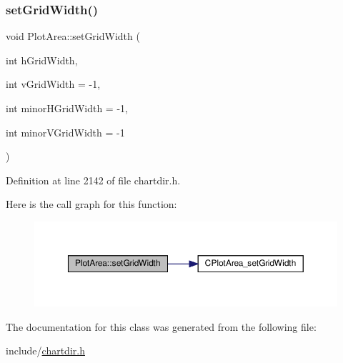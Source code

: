 \subsubsection{\texorpdfstring{set\+Grid\+Width()}{setGridWidth()}}
{\footnotesize\ttfamily void Plot\+Area\+::set\+Grid\+Width (\begin{DoxyParamCaption}\item[{int}]{h\+Grid\+Width,  }\item[{int}]{v\+Grid\+Width = {\ttfamily -\/1},  }\item[{int}]{minor\+H\+Grid\+Width = {\ttfamily -\/1},  }\item[{int}]{minor\+V\+Grid\+Width = {\ttfamily -\/1} }\end{DoxyParamCaption})\hspace{0.3cm}{\ttfamily [inline]}}



Definition at line 2142 of file chartdir.\+h.

Here is the call graph for this function\+:
\nopagebreak
\begin{figure}[H]
\begin{center}
\leavevmode
\includegraphics[width=350pt]{class_plot_area_a12308305634a1a5026d0e80811af7645_cgraph}
\end{center}
\end{figure}


The documentation for this class was generated from the following file\+:\begin{DoxyCompactItemize}
\item 
include/\hyperlink{chartdir_8h}{chartdir.\+h}\end{DoxyCompactItemize}
